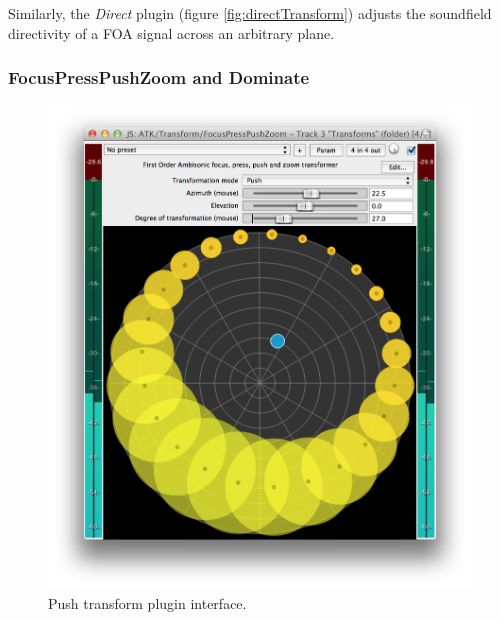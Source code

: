 \documentclass{article}
\begin{document}
Similarly, the \emph{Direct} plugin (figure \ref{fig:directTransform}) adjusts the soundfield directivity of a FOA signal across an arbitrary plane.


 
\subsubsection{FocusPressPushZoom and Dominate}\label{sec:focus}

\begin{figure}[h]
\captionsetup{aboveskip=-6pt}
\centering
\includegraphics[width=0.8\columnwidth]{figures/pushTransform.png}
\setlength{\abovecaptionskip}{0pt plus 3pt minus 2pt} %
\caption{Push transform plugin interface.\label{fig:pushTransform}}
\end{figure}
\end{document}
